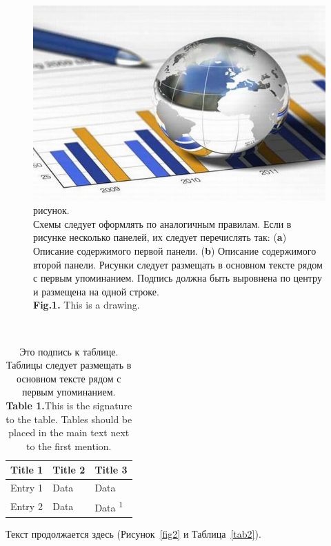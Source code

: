 \documentclass[i-edu.uz,journal,article,submit,pdftex,moreauthors]{Definitions/i-edu.uz}
\begin{document}
\begin{sloppypar}
{\begin{figure}[H]
\centering
\includegraphics[width=10.5 cm]{issledovania.jpg}
\caption{ рисунок.\\ Схемы следует оформлять по аналогичным правилам. Если в рисунке несколько панелей, их следует перечислять так: (\textbf{a}) Описание содержимого первой панели. (\textbf{b}) Описание содержимого второй панели. Рисунки следует размещать в основном тексте рядом с первым упоминанием. Подпись должна быть выровнена по центру и размещена на одной строке.\\
\textbf{Fig.1.} This is a drawing.\label{fig1}}
\end{figure}  
\\

\unskip
\begin{table}[H] 
\caption{Это подпись к таблице. Таблицы следует размещать в основном тексте рядом с первым упоминанием.\label{tab1}\\
\textbf{Table 1.}This is the signature to the table. Tables should be placed in the main text next to the first mention.\label{tab1}}
\begin{tabularx}{\textwidth}{CCC}
\toprule
\textbf{Title 1}	& \textbf{Title 2}	& \textbf{Title 3}\\
\midrule
Entry 1		& Data			& Data\\
Entry 2		& Data			& Data \textsuperscript{1}\\
\bottomrule
\end{tabularx}
\end{table}

Текст продолжается здесь (Рисунок~\ref{fig2} и Таблица~\ref{tab2}).

}
\end{sloppypar}
\end{document}
